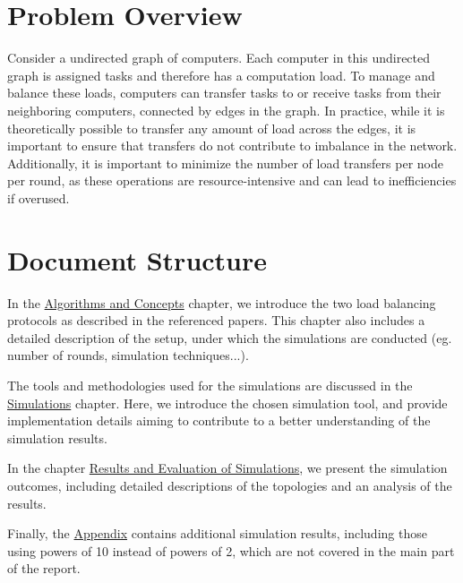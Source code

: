 \section{Problem Overview}
Consider a undirected graph of computers. Each computer in this undirected graph is assigned tasks and therefore has a computation load. To manage and balance these loads, computers can transfer tasks to or receive tasks from their neighboring computers, connected by edges in the graph.
In practice, while it is theoretically possible to transfer any amount of load across the edges, it is important to ensure that transfers do not contribute to imbalance in the network. Additionally, it is important to minimize the number of load transfers per node per round, as these operations are resource-intensive and can lead to inefficiencies if overused.

\section{Document Structure}
In the \hyperref[chap:background]{{\color{blue}}Algorithms and Concepts} chapter, we introduce the two load balancing protocols as described in the referenced papers. This chapter also includes a detailed description of the setup, under which the simulations are conducted (eg. number of rounds, simulation techniques...).

The tools and methodologies used for the simulations are discussed in the \hyperref[chap:simulations]{Simulations} chapter. Here, we introduce the chosen simulation tool, and provide implementation details aiming to contribute to a better understanding of the simulation results.

In the chapter \hyperref[chap:results]{Results and Evaluation of Simulations}, we present the simulation outcomes, including detailed descriptions of the topologies and an analysis of the results.

Finally, the \hyperref[chap:appendix]{Appendix} contains additional simulation results, including those using powers of 10 instead of powers of 2, which are not covered in the main part of the report.
